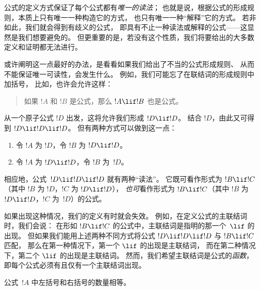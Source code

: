 \documentclass[../../../include/open-logic-section]{subfiles}
\begin{document}


\begin{explain}
公式的定义方式保证了每个公式都有\emph{唯一的读法}；
也就是说，根据公式的形成规则，本质上只有唯一一种构造它的方式，
也只有唯一一种“解释”它的方式。
若非如此，我们就会得到有歧义的公式，
即具有不止一种读法或解释的公式——这显然是我们想要避免的。
但更重要的是，若没有这个性质，我们将要给出的大多数定义和证明都无法进行。

或许阐明这一点最好的办法，是看看如果我们给出了不当的公式形成规则、
从而不能保证唯一可读性，会发生什么。
例如，我们可能忘了在联结词的形成规则中加括号，
比如，也许会允许这样：
\begin{quote}
如果 $!A$ 和 $!B$ 是公式，那么 $!A \lif !B$ 也是公式。
\end{quote}
从一个原子公式 $!D$ 出发，这将允许我们形成 $!D \lif !D$。
结合 $!D$，由此又可得到 $!D \lif !D \lif !D$。
但有两种方式可以做到这一点：
\begin{enumerate}
\item 令 $!A$ 为 $!D$，令 $!B$ 为 $!D \lif !D$。
\item 令 $!A$ 为 $!D \lif !D$，令 $!B$ 为~$!D$。
\end{enumerate}
相应地，公式~$!D \lif !D \lif !D$ 就有两种“读法”。
它既可看作形式为 $!B \lif !C$（其中 $!B$ 为 $!D$，$!C$ 为 $!D \lif !D$），
\emph{也可}看作形式为 $!B \lif !C$（其中 $!B$ 为 $!D \lif !D$，$!C$ 为~$!D$）的公式。

如果出现这种情况，我们的定义有时就会失效。
例如，在定义公式的主联结词时，我们会说：
在形如 $!B \lif !C$ 的公式中，主联结词是指明的那一个~$\lif$ 的出现。
但如果我们能用上述两种不同方式将公式 $!D \lif !D \lif !D$ 与 $!B \lif !C$ 匹配，
那么在第一种情况下，第一个 $\lif$ 的出现是主联结词，
而在第二种情况下，第二个 $\lif$ 的出现是主联结词。
然而，我们希望主联结词是公式的\emph{函数}，
即每个公式必须有且仅有一个主联结词出现。
\end{explain}

\begin{lem}
公式~$!A$ 中左括号和右括号的数量相等。
\end{lem}
\end{document}
